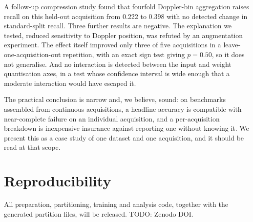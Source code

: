 \documentclass[conference]{IEEEtran}
\begin{document}
A follow-up compression study found that fourfold Doppler-bin aggregation
raises recall on this held-out acquisition from 0.222 to 0.398 with no
detected change in standard-split recall. Three further results are negative.
The explanation we tested, reduced sensitivity to Doppler position, was
refuted by an augmentation experiment. The effect itself improved only three
of five acquisitions in a leave-one-acquisition-out repetition, with an exact
sign test giving $p=0.50$, so it does not generalise. And no interaction is
detected between the input and weight quantisation axes, in a test whose
confidence interval is wide enough that a moderate interaction would have
escaped it.

The practical conclusion is narrow and, we believe, sound: on benchmarks
assembled from continuous acquisitions, a headline accuracy is compatible
with near-complete failure on an individual acquisition, and a
per-acquisition breakdown is inexpensive insurance against reporting one
without knowing it. We present this as a case study of one dataset and one
acquisition, and it should be read at that scope.

\section*{Reproducibility}

All preparation, partitioning, training and analysis code, together with the
generated partition files, will be released. TODO: Zenodo DOI.
\end{document}
